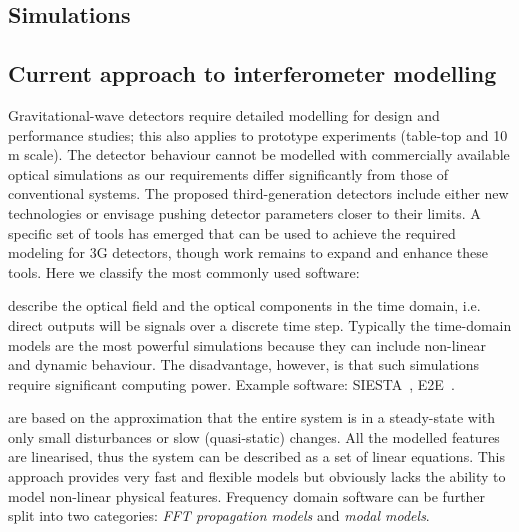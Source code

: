 \begin{samepage} %

\section{Simulations}
\subsection{Current approach to interferometer modelling}
Gravitational-wave detectors require detailed modelling for design and performance studies; this also applies 
to prototype experiments (table-top and 10\,m scale). The detector behaviour cannot be modelled with commercially available optical simulations as our requirements differ significantly from those of conventional systems. The proposed third-generation detectors include either new technologies or envisage pushing detector parameters closer to their limits. 
A specific set of tools has emerged that can be used to achieve the required modeling for 3G detectors, though work remains to expand and enhance these tools. Here we classify the most commonly used software:

 describe the optical field and the optical components in the time domain, i.e. direct outputs will be signals over a discrete time step. Typically the time-domain models are the most powerful   simulations because they can include non-linear and dynamic behaviour.
The disadvantage, however, is that such simulations require significant computing power. Example software: SIESTA~\cite{SIESTA}, E2E~\cite{e2e_2000}.


 are based on the approximation that the entire system is in a steady-state with only small disturbances or slow (quasi-static) changes. All the modelled features are linearised, thus the system can be described as a set of linear equations. 
This approach provides very fast and flexible models but obviously lacks the ability to model non-linear physical features. Frequency domain software can be further split into two categories: \emph{FFT propagation models} and \emph{modal models}.

\end{samepage} %

